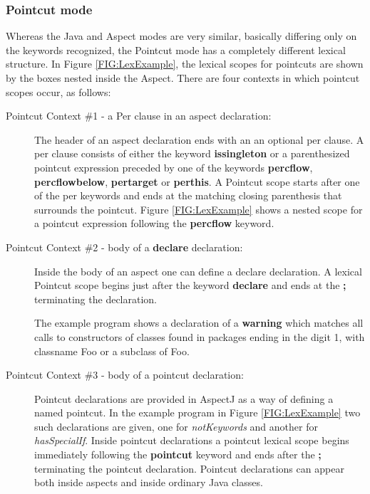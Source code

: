 \subsubsection{{\sc Pointcut} mode}
Whereas the {\sc Java} and {\sc Aspect} modes are very similar, basically
differing only on the keywords recognized, the {\sc Pointcut} mode
has a completely different lexical structure.   
In Figure \ref{FIG:LexExample},  the lexical scopes for pointcuts are
shown by the boxes nested inside the Aspect.   There are four contexts in
which pointcut scopes occur, as follows:

\begin{description}
\item[Pointcut Context \#1 - a Per clause in an aspect declaration:]
The header of an aspect
declaration ends with an an optional per clause.  A per clause consists
of either the keyword {\bf issingleton} or  a parenthesized pointcut
expression preceded by one of the keywords {\bf percflow}, 
{\bf percflowbelow}, {\bf pertarget} or {\bf perthis}.    
A {\sc Pointcut} scope starts after one of the per keywords and ends at
the matching closing parenthesis that surrounds the pointcut.   Figure
\ref{FIG:LexExample} shows a nested scope for a pointcut expression 
following the {\bf percflow} keyword.

\item[Pointcut Context \#2 - body of a {\bf declare} declaration:]
Inside the body of an aspect one can define
a declare declaration.   A lexical {\sc Pointcut} scope begins just after
the keyword {\bf declare} and ends at the {\bf ;} terminating the 
declaration.  

The example program shows a  
declaration of  a {\bf warning} which matches all calls to constructors of
classes found in packages ending in the digit 1, with classname Foo or
a subclass of Foo. 

\item[Pointcut Context \#3 - body of a pointcut declaration:]

Pointcut declarations are provided in AspectJ as a way of 
defining a named pointcut.  In the example program in 
Figure \ref{FIG:LexExample} two such declarations are given, one
for {\em notKeywords} and another for {\em hasSpecialIf}.   
Inside pointcut declarations a pointcut lexical scope begins
immediately following the {\bf pointcut} keyword and ends 
after the {\bf ;} terminating the pointcut declaration.
Pointcut declarations can appear both inside aspects and inside
ordinary Java classes.


\end{description}
